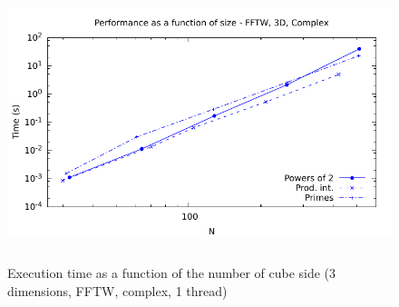\documentclass[12pt, a4paper]{article}
\begin{document}
\begin{figure}[H]
\captionsetup{width=0.6\textwidth}
\centering
\includegraphics[height=8cm]{graphs/performance/3d-fftw-c.pdf}
\caption{Execution time as a function of the number of cube side (3 dimensions, FFTW, complex, 1 thread)}
\label{3DFFTWC}
\end{figure}   
\end{document}
